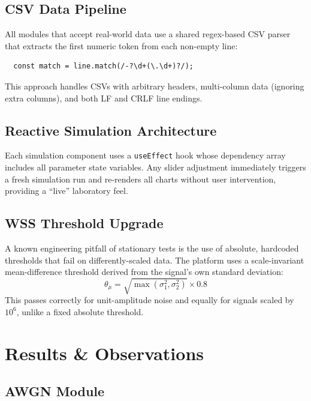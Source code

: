 \documentclass[12pt, a4paper]{article}
\begin{document}
\subsection{CSV Data Pipeline}

All modules that accept real-world data use a shared regex-based CSV parser that
extracts the first numeric token from each non-empty line:
\begin{verbatim}
  const match = line.match(/-?\d+(\.\d+)?/);
\end{verbatim}
This approach handles CSVs with arbitrary headers, multi-column data (ignoring extra
columns), and both LF and CRLF line endings.

\subsection{Reactive Simulation Architecture}

Each simulation component uses a \texttt{useEffect} hook whose dependency array
includes all parameter state variables. Any slider adjustment immediately triggers
a fresh simulation run and re-renders all charts without user intervention, providing
a ``live'' laboratory feel.

\subsection{WSS Threshold Upgrade}

A known engineering pitfall of stationary tests is the use of absolute, hardcoded
thresholds that fail on differently-scaled data. The platform uses a
scale-invariant mean-difference threshold derived from the signal's own standard
deviation:
\begin{equation}
  \theta_\mu = \sqrt{\max(\sigma_1^2, \sigma_2^2)} \times 0.8
\end{equation}
This passes correctly for unit-amplitude noise and equally for signals scaled by
$10^6$, unlike a fixed absolute threshold.

\section{Results \& Observations}

\subsection{AWGN Module}
\end{document}
